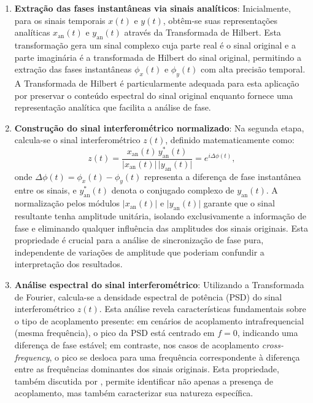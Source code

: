 \begin{enumerate}
    \item \textbf{Extração das fases instantâneas via sinais analíticos}: Inicialmente, para os sinais temporais \(x(t)\) e \(y(t)\), obtêm-se suas representações analíticas \(x_{\mathrm{an}}(t)\) e \(y_{\mathrm{an}}(t)\) através da Transformada de Hilbert. Esta transformação gera um sinal complexo cuja parte real é o sinal original e a parte imaginária é a transformada de Hilbert do sinal original, permitindo a extração das fases instantâneas \(\phi_x(t)\) e \(\phi_y(t)\) com alta precisão temporal. A Transformada de Hilbert é particularmente adequada para esta aplicação por preservar o conteúdo espectral do sinal original enquanto fornece uma representação analítica que facilita a análise de fase.

    \item \textbf{Construção do sinal interferométrico normalizado}: Na segunda etapa, calcula-se o sinal interferométrico \(z(t)\), definido matematicamente como:
    \[
    z(t) = \frac{x_{\mathrm{an}}(t)\, y_{\mathrm{an}}^*(t)}{\lvert x_{\mathrm{an}}(t)\rvert\, \lvert y_{\mathrm{an}}(t)\rvert} = e^{i\Delta \phi(t)},
    \]
    onde \(\Delta \phi(t) = \phi_x(t) - \phi_y(t)\) representa a diferença de fase instantânea entre os sinais, e \(y_{\mathrm{an}}^*(t)\) denota o conjugado complexo de \(y_{\mathrm{an}}(t)\). A normalização pelos módulos \(\lvert x_{\mathrm{an}}(t)\rvert\) e \(\lvert y_{\mathrm{an}}(t)\rvert\) garante que o sinal resultante tenha amplitude unitária, isolando exclusivamente a informação de fase e eliminando qualquer influência das amplitudes dos sinais originais. Esta propriedade é crucial para a análise de sincronização de fase pura, independente de variações de amplitude que poderiam confundir a interpretação dos resultados.

    \item \textbf{Análise espectral do sinal interferométrico}: Utilizando a Transformada de Fourier, calcula-se a densidade espectral de potência (PSD) do sinal interferométrico \(z(t)\). Esta análise revela características fundamentais sobre o tipo de acoplamento presente: em cenários de acoplamento intrafrequencial (mesma frequência), o pico da PSD está centrado em \(f = 0\), indicando uma diferença de fase estável; em contraste, nos casos de acoplamento \textit{cross-frequency}, o pico se desloca para uma frequência correspondente à diferença entre as frequências dominantes dos sinais originais. Esta propriedade, também discutida por , permite identificar não apenas a presença de acoplamento, mas também caracterizar sua natureza específica.


\end{enumerate}
